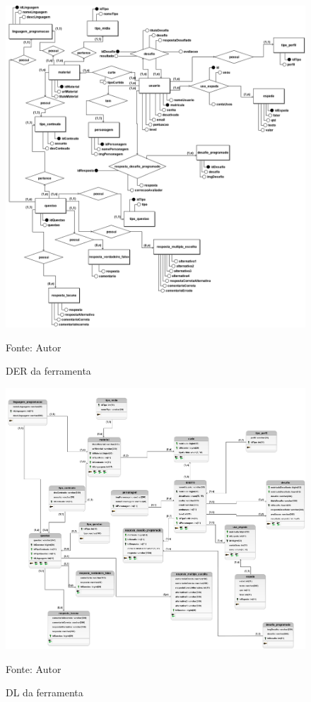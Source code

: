 \begin{figure}[h]
	\centering
	\includegraphics[keepaspectratio=true,scale=0.4]{figuras/der.png}
	\caption{DER da ferramenta}
	Fonte: Autor
	\label{figura2}
\end{figure}


\begin{figure}[h]
	\centering
	\includegraphics[keepaspectratio=true,scale=0.32]{figuras/dl.png}
	\caption{DL da ferramenta}
	Fonte: Autor
	\label{figura3}
\end{figure}





